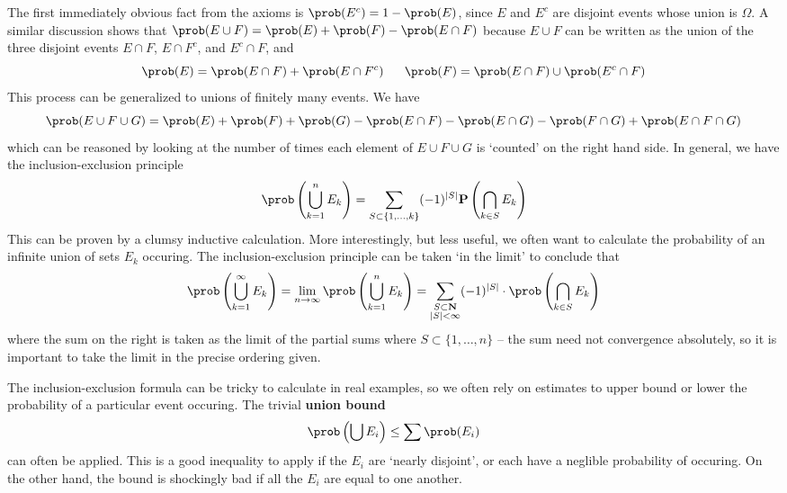 The first immediately obvious fact from the axioms is $\prob(E^c) = 1 - \prob(E)$, since $E$ and $E^c$ are disjoint events whose union is $\Omega$. A similar discussion shows that $\prob(E \cup F) = \prob(E) + \prob(F) - \prob(E \cap F)$ because $E \cup F$ can be written as the union of the three disjoint events $E \cap F$, $E \cap F^c$, and $E^c \cap F$, and
%
\[ \prob(E) = \prob(E \cap F) + \prob(E \cap F^c)\ \ \ \ \ \prob(F) = \prob(E \cap F) \cup \prob(E^c \cap F) \]
%
This process can be generalized to unions of finitely many events. We have
%
\[ \prob(E \cup F \cup G) = \prob(E) + \prob(F) + \prob(G) - \prob(E \cap F) - \prob(E \cap G) - \prob(F \cap G) + \prob(E \cap F \cap G) \]
%
which can be reasoned by looking at the number of times each element of $E \cup F \cup G$ is `counted' on the right hand side. In general, we have the inclusion-exclusion principle
%
\[ \prob \left( \bigcup_{k = 1}^n E_k \right) = \sum_{S \subset \{ 1, \dots, k \}} (-1)^{|S|} \mathbf{P} \left( \bigcap_{k \in S} E_k \right) \]
%
This can be proven by a clumsy inductive calculation. More interestingly, but less useful, we often want to calculate the probability of an infinite union of sets $E_k$ occuring. The inclusion-exclusion principle can be taken `in the limit' to conclude that
%
\[ \prob \left(\bigcup_{k = 1}^\infty E_k \right) = \lim_{n \to \infty} \prob \left( \bigcup_{k = 1}^n E_k \right) = \sum_{\substack{S \subset \mathbf{N}\\|S| < \infty}} (-1)^{|S|} \cdot \prob \left( \bigcap_{k \in S} E_k \right) \]
%
where the sum on the right is taken as the limit of the partial sums where $S \subset \{ 1, \dots, n \}$ -- the sum need not convergence absolutely, so it is important to take the limit in the precise ordering given.

The inclusion-exclusion formula can be tricky to calculate in real examples, so we often rely on estimates to upper bound or lower the probability of a particular event occuring. The trivial {\bf union bound}
%
\[ \prob \left( \bigcup E_i \right) \leq \sum \prob(E_i) \]
%
can often be applied. This is a good inequality to apply if the $E_i$ are `nearly disjoint', or each have a neglible probability of occuring. On the other hand, the bound is shockingly bad if all the $E_i$ are equal to one another.

